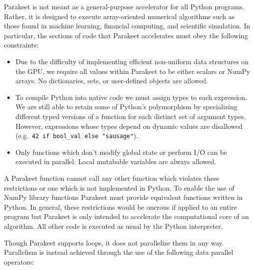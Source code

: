 \documentclass[10pt,twocolumn]{article}
\begin{document}
Parakeet is not meant as a general-purpose accelerator for all Python programs.  Rather, it is designed to execute array-oriented numerical algorithms such as those found in machine learning, financial computing, and scientific simulation. In particular, the sections of code that Parakeet accelerates must obey the following constraints:

\begin{itemize}
\item Due to the difficulty of implementing efficient non-uniform data structures on the GPU, we require all values within Parakeet to be either scalars or NumPy arrays. No dictionaries, sets, or user-defined objects are allowed. 
\item To compile Python into native code we must assign types to each expression. We are still able to retain some of Python's polymorphism by specializing different typed versions of a function for each distinct set of argument types. However, expressions whose types depend on dynamic values are disallowed (e.g.~\lstinline{42 if bool_val else "sausage"}).
\item Only functions which don't modify global state or perform I/O can be executed in parallel. Local mutabable variables are always allowed.
\end{itemize}
A Parakeet function cannot call any other function which violates these restrictions or one which is not implemented in Python. To enable the use of NumPy library functions Parakeet must provide equivalent functions written in Python. In general, these restrictions would be onerous if applied to an entire program but Parakeet is only intended to accelerate the computational core of an algorithm. All other code is executed as usual by the Python interpreter. 

Though Parakeet supports loops, it does not parallelize them in any way. Parallelism is instead achieved through the use of the following data parallel operators:
\end{document}
